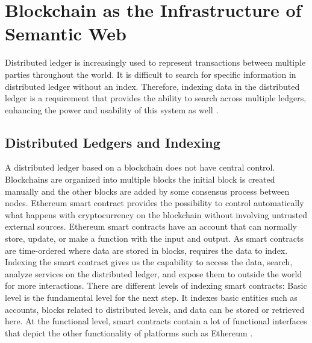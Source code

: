 \chapter{Blockchain as the Infrastructure of Semantic Web}
Distributed ledger is increasingly used to represent transactions between multiple parties throughout the world. It is difficult to search for specific information in distributed ledger without an index. Therefore, indexing data in the distributed ledger is a requirement that provides the ability to search across multiple ledgers, enhancing the power and usability of this system as well \cite{Third}.
\section{Distributed Ledgers and Indexing}
A distributed ledger based on a blockchain does not have central control. Blockchains are organized into multiple blocks the initial block is created manually and the other blocks are added by some consensus process between nodes.
Ethereum smart contract provides the possibility to control automatically what happens with cryptocurrency on the blockchain without involving untrusted external sources. Ethereum smart contracts have an account that can normally store, update, or make a function with the input and output.
As smart contracts are time-ordered where data are stored in blocks,  requires the data to index. Indexing the smart contract gives us the capability to access the data, search, analyze services on the distributed ledger, and expose them to outside the world for more interactions.
There are different levels of indexing smart contracts: Basic level is the fundamental level for the next step. It indexes basic entities such as accounts, blocks related to distributed levels, and data can be stored or retrieved here. At the functional level, smart contracts contain a lot of functional interfaces that depict the other functionality of platforms such as Ethereum \cite{Third}. 

